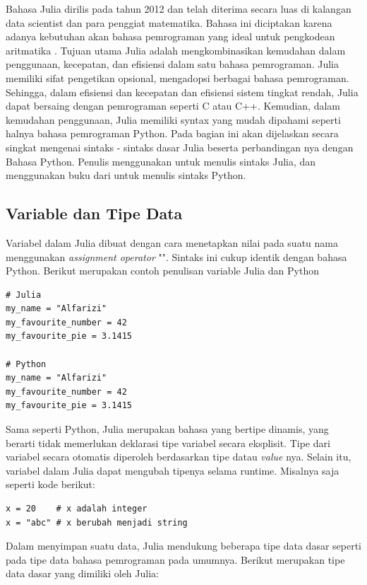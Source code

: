 Bahasa Julia dirilis pada tahun 2012 dan telah diterima secara luas di kalangan
data scientist dan para penggiat matematika. Bahasa ini diciptakan karena
adanya kebutuhan akan bahasa pemrograman yang ideal untuk pengkodean aritmatika
\citep{ismiPentingUntukData2021}. Tujuan utama Julia adalah mengkombinasikan
kemudahan dalam penggunaan, kecepatan, dan efisiensi dalam satu bahasa
pemrograman. Julia memiliki sifat pengetikan opsional, mengadopsi berbagai
bahasa pemrograman. Sehingga, dalam efisiensi dan kecepatan dan efisiensi
sistem tingkat rendah, Julia dapat bersaing dengan pemrograman seperti C atau
C++. Kemudian, dalam kemudahan penggunaan, Julia memiliki syntax yang mudah
dipahami seperti halnya bahasa pemrograman Python. Pada bagian ini akan
dijelaskan secara singkat mengenai sintaks - sintaks dasar Julia beserta
perbandingan nya dengan Bahasa Python. Penulis menggunakan
\cite{dokumentasijuliaJuliaDocumentationJulia2024} untuk menulis sintaks Julia,
dan menggunakan buku dari \cite{matthesPythonCrashCourse2016} untuk menulis
sintaks Python.

\subsection{Variable dan Tipe Data}

Variabel dalam Julia dibuat dengan cara menetapkan nilai pada suatu nama
menggunakan \emph{assignment operator} "\cw{=}". Sintaks ini cukup identik
dengan bahasa Python. Berikut merupakan contoh penulisan variable Julia dan
Python

\begin{lstlisting}
# Julia
my_name = "Alfarizi"
my_favourite_number = 42
my_favourite_pie = 3.1415

# Python
my_name = "Alfarizi"
my_favourite_number = 42
my_favourite_pie = 3.1415
\end{lstlisting}

\noindent
Sama seperti Python, Julia merupakan bahasa yang bertipe dinamis, yang berarti tidak memerlukan deklarasi
tipe variabel secara eksplisit. Tipe dari variabel secara otomatis diperoleh
berdasarkan tipe datau \emph{value} nya. Selain itu, variabel dalam Julia dapat mengubah
tipenya selama runtime. Misalnya saja seperti kode berikut:

\begin{lstlisting}
x = 20    # x adalah integer
x = "abc" # x berubah menjadi string
\end{lstlisting}

\label{basic tipe data julia} Dalam menyimpan suatu data, Julia mendukung
beberapa tipe data dasar seperti pada tipe data bahasa pemrograman pada umumnya.
Berikut merupakan tipe data dasar yang dimiliki oleh Julia:

